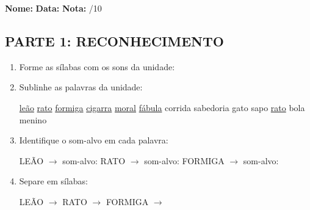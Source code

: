 \begin{exercicio}

\noindent\textbf{Nome:} \underline{\hspace{3.2cm}} \quad \textbf{Data:} \underline{\hspace{1.6cm}} \quad \textbf{Nota:} \underline{\hspace{0.9cm}}/10


\subsection*{PARTE 1: RECONHECIMENTO}

\begin{enumerate}

  \item Forme as sílabas com os sons da unidade:

\begin{center}
\end{center}

  \item Sublinhe as palavras da unidade:

\begin{center}
  \uline{leão} \quad \uline{rato} \quad \uline{formiga} \quad \uline{cigarra} \quad \uline{moral} \quad \uline{fábula} \quad corrida \quad sabedoria \quad gato \quad sapo \quad \uline{rato} \quad bola \quad menino
\end{center}

  \item Identifique o som-alvo em cada palavra:
  \begin{center}
  LEÃO $\rightarrow$ som-alvo: \underline{\hspace{1cm}} \quad RATO $\rightarrow$ som-alvo: \underline{\hspace{1cm}} \quad FORMIGA $\rightarrow$ som-alvo: \underline{\hspace{1cm}}
  \end{center}

  \item Separe em sílabas:
  \begin{center}
  LEÃO $\rightarrow$ \underline{\hspace{1cm}} \quad RATO $\rightarrow$ \underline{\hspace{1cm}} \quad FORMIGA $\rightarrow$ \underline{\hspace{1cm}}
  \end{center}


\end{enumerate}
\end{exercicio}

